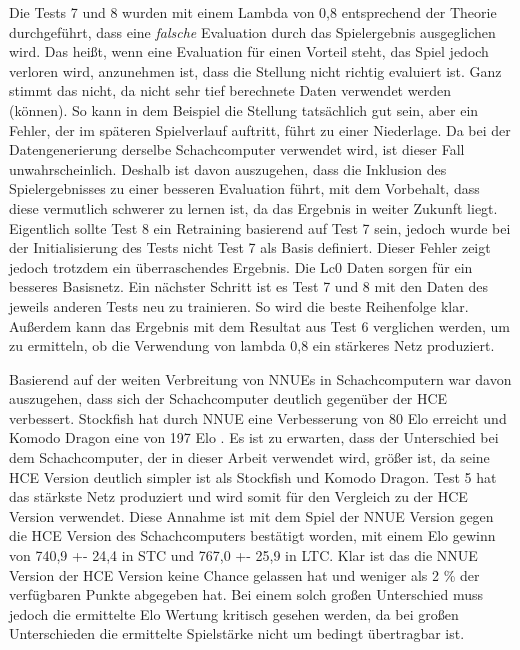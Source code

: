Die Tests 7 und 8 wurden mit einem Lambda von 0,8 entsprechend der Theorie durchgeführt, dass eine \emph{falsche} Evaluation durch das Spielergebnis ausgeglichen wird. Das heißt, wenn eine Evaluation für einen Vorteil steht, das Spiel jedoch verloren wird, anzunehmen ist, dass die Stellung nicht richtig evaluiert ist. Ganz stimmt das nicht, da nicht sehr tief berechnete Daten verwendet werden (können). So kann in dem Beispiel die Stellung tatsächlich gut sein, aber ein Fehler, der im späteren Spielverlauf auftritt, führt zu einer Niederlage. Da bei der Datengenerierung derselbe Schachcomputer verwendet wird, ist dieser Fall unwahrscheinlich. Deshalb ist davon auszugehen, dass die Inklusion des Spielergebnisses zu einer besseren Evaluation führt, mit dem Vorbehalt, dass diese vermutlich schwerer zu lernen ist, da das Ergebnis in weiter Zukunft liegt. Eigentlich sollte Test 8 ein Retraining basierend auf Test 7 sein, jedoch wurde bei der Initialisierung des Tests nicht Test 7 als Basis definiert. Dieser Fehler zeigt jedoch trotzdem ein überraschendes Ergebnis. Die \ac{Lc0} Daten sorgen für ein besseres Basisnetz. Ein nächster Schritt ist es Test 7 und 8 mit den Daten des jeweils anderen Tests neu zu trainieren. So wird die beste Reihenfolge klar. Außerdem kann das Ergebnis mit dem Resultat aus Test 6 verglichen werden, um zu ermitteln, ob die Verwendung von lambda 0,8 ein stärkeres Netz produziert.

Basierend auf der weiten Verbreitung von \acp{NNUE} in Schachcomputern war davon auszugehen, dass sich der Schachcomputer deutlich gegenüber der \ac{HCE} verbessert. Stockfish hat durch \ac{NNUE} eine Verbesserung von 80 Elo erreicht und Komodo Dragon eine von 197 Elo \cite{StockfishIntroducingNNUE, KomodoDragon}. Es ist zu erwarten, dass der Unterschied bei dem Schachcomputer, der in dieser Arbeit verwendet wird, größer ist, da seine \ac{HCE} Version deutlich simpler ist als Stockfish und Komodo Dragon. Test 5 hat das stärkste Netz produziert und wird somit für den Vergleich zu der \ac{HCE} Version verwendet. Diese Annahme ist mit dem Spiel der \ac{NNUE} Version gegen die \ac{HCE} Version des Schachcomputers bestätigt worden, mit einem Elo gewinn von 740,9 +- 24,4 in \ac{STC} und 767,0 +- 25,9 in \ac{LTC}. Klar ist das die \ac{NNUE} Version der \ac{HCE} Version keine Chance gelassen hat und weniger als 2 \% der verfügbaren Punkte abgegeben hat. Bei einem solch großen Unterschied muss jedoch die ermittelte Elo Wertung kritisch gesehen werden, da bei großen Unterschieden die ermittelte Spielstärke nicht um bedingt übertragbar ist.

